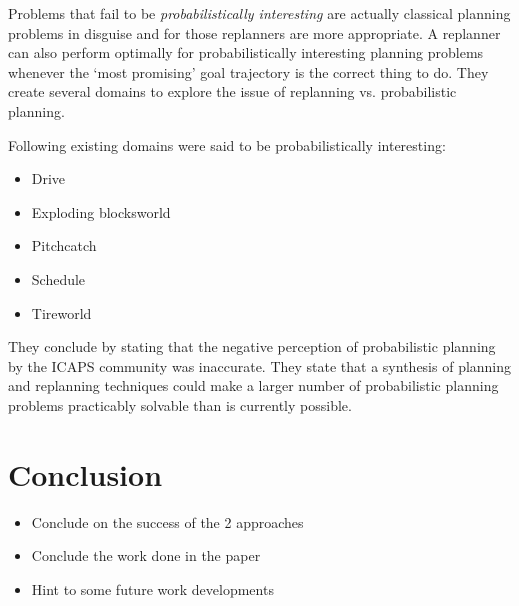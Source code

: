 \documentclass[runningheads,a4paper]{llncs}
\begin{document}
Problems that fail to be \emph{probabilistically interesting} are actually classical planning problems in disguise and for those replanners are more appropriate. A replanner can also perform optimally for probabilistically interesting planning problems whenever the `most promising' goal trajectory is the correct thing to do. They create several domains to explore the issue of replanning vs\@. probabilistic planning.

Following existing domains were said to be probabilistically interesting:
\begin{itemize}
	\item Drive
	\item Exploding blocksworld
	\item Pitchcatch
	\item Schedule
	\item Tireworld
\end{itemize}

They conclude by stating that the negative perception of probabilistic planning by the ICAPS community was inaccurate. They state that a synthesis of planning and replanning techniques could make a larger number of probabilistic planning problems practicably solvable than is currently possible.


\section{Conclusion}

\begin{itemize}
	\item Conclude on the success of the 2 approaches
	\item Conclude the work done in the paper
	\item Hint to some future work developments
\end{itemize}
\end{document}
